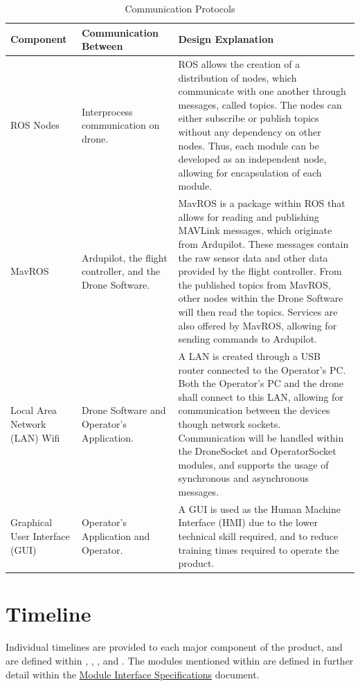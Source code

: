 \documentclass[12pt, titlepage]{article}
\begin{document}
\begin{table}[!h]
\begin{center}
\caption {Communication Protocols}
\label{tab:commProtocols}
\begin{tabular}{ | m{2.7cm} | m{4.5cm} | m{7.8cm} | } 
\hline
Component & Communication Between & Design Explanation \\
\hline
ROS Nodes & Interprocess communication on drone. &
    ROS allows the creation of a distribution of nodes, which communicate with one another through messages, called topics. The nodes can either subscribe or publish topics without any dependency on other nodes. Thus, each module can be developed as an independent node, allowing for encapsulation of each module. \\
\hline
MavROS & Ardupilot, the flight controller, and the Drone Software. &
    MavROS is a package within ROS that allows for reading and publishing MAVLink messages, which originate from Ardupilot. These messages contain the raw sensor data and other data provided by the flight controller. From the published topics from MavROS, other nodes within the Drone Software will then read the topics. Services are also offered by MavROS, allowing for sending commands to Ardupilot. \\
\hline
Local Area Network (LAN) Wifi & Drone Software and Operator's Application. &
    A LAN is created through a USB router connected to the Operator's PC. Both the Operator's PC and the drone shall connect to this LAN, allowing for communication between the devices though network sockets. Communication will be handled within the DroneSocket and OperatorSocket modules, and supports the usage of synchronous and asynchronous messages. \\
\hline
Graphical User Interface (GUI) & Operator's Application and Operator. &
    A GUI is used as the Human Machine Interface (HMI) due to the lower technical skill required, and to reduce training times required to operate the product. \\
\hline
\end{tabular}
\end{center}
\end{table}

\clearpage

\section{Timeline}
\label{sec:timeline}

Individual timelines are provided to each major component of the product, and are defined within , , , and . The modules mentioned within  are defined in further detail within the  \href{https://github.com/icecap360/DroneCapstone/blob/master/docs/Design/SoftDetailedDes/MIS.pdf}{Module Interface Specifications} document.
\end{document}
